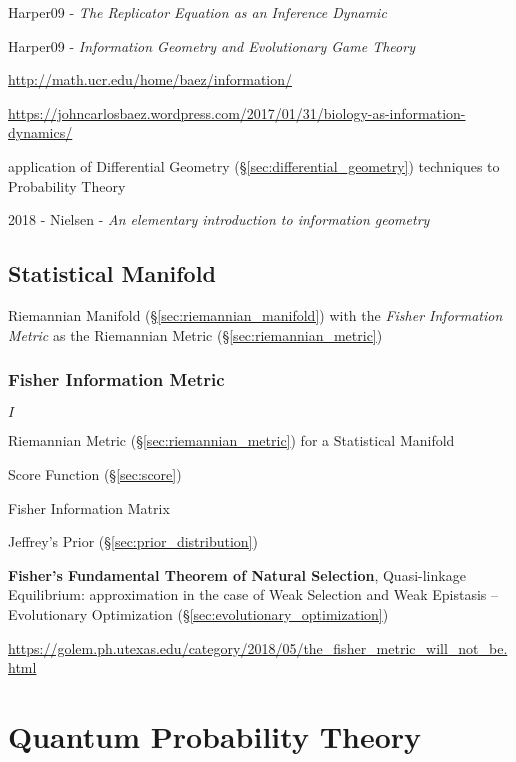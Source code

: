 Harper09 - \emph{The Replicator Equation as an Inference Dynamic}

Harper09 - \emph{Information Geometry and Evolutionary Game Theory}

\url{http://math.ucr.edu/home/baez/information/}

\url{https://johncarlosbaez.wordpress.com/2017/01/31/biology-as-information-dynamics/}

application of Differential Geometry
(\S\ref{sec:differential_geometry}) techniques to Probability Theory

2018 - Nielsen - \emph{An elementary introduction to information geometry}



\subsection{Statistical Manifold}\label{sec:statistical_manifold}

Riemannian Manifold (\S\ref{sec:riemannian_manifold}) with the
\emph{Fisher Information Metric} as the Riemannian Metric
(\S\ref{sec:riemannian_metric})



\subsubsection{Fisher Information Metric}\label{sec:fisher_metric}

$I$

Riemannian Metric (\S\ref{sec:riemannian_metric}) for a Statistical Manifold

Score Function (\S\ref{sec:score})

Fisher Information Matrix

Jeffrey's Prior (\S\ref{sec:prior_distribution})

\fist \textbf{Fisher's Fundamental Theorem of Natural Selection},
Quasi-linkage Equilibrium: approximation in the case of Weak Selection
and Weak Epistasis -- Evolutionary Optimization
(\S\ref{sec:evolutionary_optimization}) %

\url{https://golem.ph.utexas.edu/category/2018/05/the_fisher_metric_will_not_be.html}



\section{Quantum Probability Theory}\label{sec:quantum_probability}

